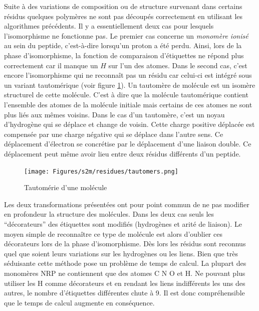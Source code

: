 Suite à des variations de composition ou de structure survenant dans certains résidus quelques polymères ne sont pas découpés correctement en utilisant les algorithmes précédents.
Il y a essentiellement deux cas pour lesquels l'isomorphisme ne fonctionne pas.
Le premier cas concerne un \textit{monomère ionisé} au sein du peptide, c'est-à-dire lorsqu'un proton a été perdu.
Ainsi, lors de la phase d'isomorphisme, la fonction de comparaison d'étiquettes ne répond plus correctement car il manque un $H$ sur l'un des atomes.
Dans le second cas, c'est encore l'isomorphisme qui ne reconnaît pas un résidu car celui-ci est intégré sous un variant tautomérique (voir figure \ref{tautomer}).
Un tautomère de molécule est un isomère structurel de cette molécule.
C'est à dire que la molécule tautomérique contient l'ensemble des atomes de la molécule initiale  mais certains de ces atomes ne sont plus liés aux mêmes voisins.
Dans le cas d'un tautomère, c'est un noyau d'hydrogène qui se déplace et change de voisin.
Cette charge positive déplacée est compensée par une charge négative qui se déplace dans l'autre sens.
Ce déplacement d'électron se concrétise par le déplacement d'une liaison double.
Ce déplacement peut même avoir lieu entre deux résidus différents d'un peptide.

\begin{figure}
  \begin{center}
    \texttt{[image: Figures/s2m/residues/tautomers.png]}
    \caption{\label{tautomer}Tautomérie d'une molécule}
  \end{center}
\end{figure}

Les deux transformations présentées ont pour point commun de ne pas modifier en profondeur la structure des molécules.
Dans les deux cas seuls les ``décorateurs'' des étiquettes sont modifiés (hydrogènes et arité de liaison).
Le moyen simple de reconnaître ce type de molécule est alors d'oublier ces décorateurs lors de la phase d'isomorphisme.
Dès lors les résidus sont reconnus quel que soient leurs variations sur les hydrogènes ou les liens.
Bien que très séduisante cette méthode pose un problème de temps de calcul.
La plupart des monomères NRP ne contiennent que des atomes C N O et H.
Ne pouvant plus utiliser les H comme décorateurs et en rendant les liens indifférents les uns des autres, le nombre d'étiquettes différentes chute à 9.
Il est donc compréhensible que le temps de calcul augmente en conséquence.

